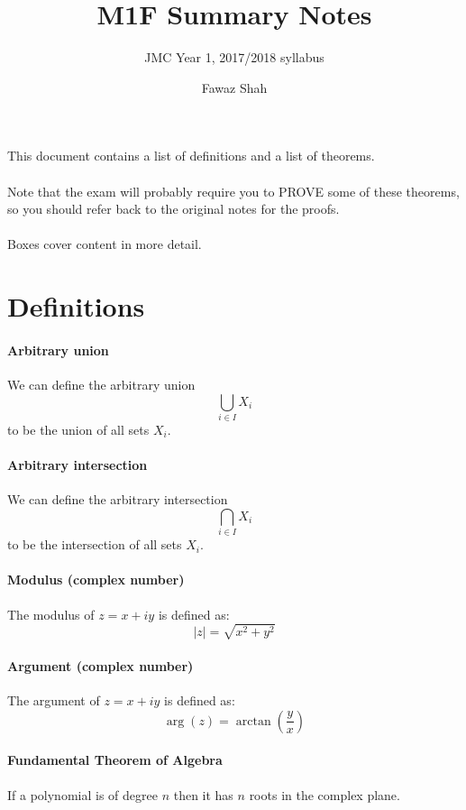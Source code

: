 \documentclass{scrartcl}
\title{M1F Summary Notes}
\subtitle{JMC Year 1, 2017/2018 syllabus}
\date{}
\author{Fawaz Shah}
\begin{document}
\large
\maketitle
\noindent This document contains a list of definitions and a list of theorems.
\\\\
Note that the exam will probably require you to PROVE some of these theorems, so you should refer back to the original notes for the proofs.
\\\\
Boxes cover content in more detail.
\tableofcontents
\newpage

\section{Definitions}
\paragraph{Arbitrary union}
We can define the arbitrary union
\begin{equation}
\bigcup_{i \in I} X_{i}
\end{equation}
to be the union of all sets $ X_{i} $.
\paragraph{Arbitrary intersection}
We can define the arbitrary intersection
\begin{equation}
\bigcap_{i \in I} X_{i}
\end{equation}
to be the intersection of all sets $ X_{i} $.
\paragraph{Modulus (complex number)}
The modulus of $ z = x + iy $ is defined as:
\begin{equation}
|z| = \sqrt{x^{2} + y^{2}}
\end{equation}
\paragraph{Argument (complex number)}
The argument of $ z = x + iy $ is defined as:
\begin{equation}
\arg(z) = \arctan(\frac{y}{x})
\end{equation}
\paragraph{Fundamental Theorem of Algebra}
If a polynomial is of degree $ n $ then it has $ n $ roots in the complex plane.
\end{document}
